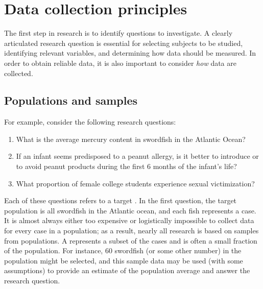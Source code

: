\section{Data collection principles}
\label{dataCollectionPrinciples}


The first step in research is to identify questions to investigate. A clearly articulated research question is essential for selecting subjects to be studied, identifying relevant variables, and determining how data should be measured. In order to obtain reliable data, it is also important to consider \textit{how} data are collected.

\subsection{Populations and samples}
\label{populationsAndSamples}

For example, consider the following research questions:

\begin{enumerate}
\setlength{\itemsep}{0mm}

\item What is the average mercury content in swordfish in the Atlantic Ocean?

\item If an infant seems predisposed to a peanut allergy, is it better to introduce or to avoid peanut products during the first 6 months of the infant's life?

\item What proportion of female college students experience sexual victimization?

\end{enumerate}

Each of these questions refers to a target . In the first question, the target population is all swordfish in the Atlantic ocean, and each fish represents a case. It is almost always either too expensive or logistically impossible to collect data for every case in a population; as a result, nearly all research is based on samples from populations. A  represents a subset of the cases and is often a small fraction of the population. For instance, 60 swordfish (or some other number) in the population might be selected, and this sample data may be used (with some assumptions) to provide an estimate of the population average and answer the research question.



